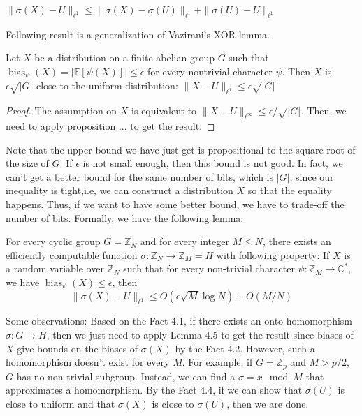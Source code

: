 \begin{fact}
$\| \sigma(X) - U \|_{\ell^1} \leq \| \sigma(X) - \sigma(U) \|_{\ell^1} + \| \sigma(U) - U \|_{\ell^1} $
\end{fact}

Following result is a generalization of Vazirani's XOR lemma.
\begin{lemma}
Let $X$ be a distribution on a finite abelian group $G$ such that $\operatorname{bias}_\psi(X) = |\mathbb{E}[\psi (X)] | \leq \epsilon$ for every nontrivial character $\psi$. Then $X$ is $\epsilon \sqrt{|G|}$-close to the uniform distribution: $\| X - U \|_{\ell^1} \leq \epsilon \sqrt{|G|}$
\end{lemma}

\begin{proof}
The assumption on $X$ is equivalent to $\|X - U \|_{\ell^\infty} \leq \epsilon/\sqrt{|G|}$. Then, we need to apply proposition ... to get the result.
\end{proof}

Note that the upper bound we have just get is propositional to the square root of the size of $G$. If $\epsilon$ is not small enough, then this bound is not good. In fact, we can't get a better bound for the same number of bits, which is $|G|$, since our inequality is tight,i.e, we can construct a distribution $X$ so that the equality happens. Thus, if we want to have some better bound, we have to trade-off the number of bits. Formally, we have the following lemma. 

\begin{lemma}
For every cyclic group $G = \mathbb{Z}_N$ and for every integer $M \leq N$, there exists an efficiently computable function $\sigma : \mathbb{Z}_N \rightarrow \mathbb{Z}_M = H$ with following property: If $X$ is a random variable over $\mathbb{Z}_N$ such that for every non-trivial character $\psi : \mathbb{Z}_M \rightarrow \mathbb{C}^*$, we have $\operatorname{bias}_{\psi}(X) \leq \epsilon$, then 
$$\| \sigma(X) - U \|_{\ell^1} \leq O(\epsilon \sqrt{M} \log N) + O(M/N)$$
\end{lemma}

Some observations: Based on the Fact 4.1, if there exists an onto homomorphism $\sigma: G \rightarrow H$, then we just need to apply Lemma 4.5 to get the result since biases of $X$ give bounds on the biases of $\sigma(X)$ by the Fact 4.2. However, such a homomorphism doesn't exist for every $M$. For example, if $G= \mathbb{Z}_p$ and $M > p/2$, $G$ has no non-trivial subgroup. Instead, we can find a $\sigma = x \mod M$ that approximates a homomorphism. By the Fact 4.4, if we can show that $\sigma(U)$ is close to uniform and that $\sigma(X)$ is close to $\sigma(U)$, then we are done. 

